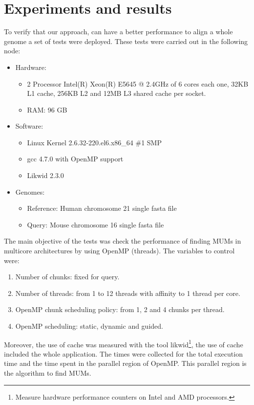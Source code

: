 \documentclass[3p,times]{elsarticle}
\begin{document}
\section{Experiments and results}
To verify that our approach, can have a better performance to align a whole genome a set of tests were deployed. These tests were carried out in the following node:
\begin{itemize}
\item Hardware:  
\begin{itemize}
\item 2 Processor Intel(R) Xeon(R) E5645 @ 2.4GHz of 6 cores each one, 32KB L1 cache, 256KB L2 and 12MB L3 shared cache per socket.
\item RAM: 96 GB
\end{itemize}
\item  Software: 
\begin{itemize}
\item Linux Kernel 2.6.32-220.el6.x86\_64 \#1 SMP
\item gcc 4.7.0 with OpenMP support
\item Likwid 2.3.0
\end{itemize}
\item Genomes:
  \begin{itemize}
    \item Reference: Human chromosome 21 single fasta file
    \item Query: Mouse chromosome 16 single fasta file
  \end{itemize}
\end{itemize}
The main objective of the tests was check the performance of finding MUMs in multicore architectures by using OpenMP (threads). The variables to control were:
\begin{enumerate}
  \item Number of chunks: fixed for query.
  \item Number of threads: from 1 to 12 threads with affinity to 1 thread per core.
  \item OpenMP chunk scheduling policy: from 1, 2 and 4 chunks per thread.
  \item OpenMP scheduling: static, dynamic and guided.
\end{enumerate}
Moreover, the use of cache was measured with the tool likwid\footnote{Measure hardware performance counters on Intel and AMD processors.}, the use of cache included the whole application.  The times were collected for the total execution time and the time spent in the parallel region of OpenMP. This parallel region is the algorithm to find MUMs.\\
\end{document}
